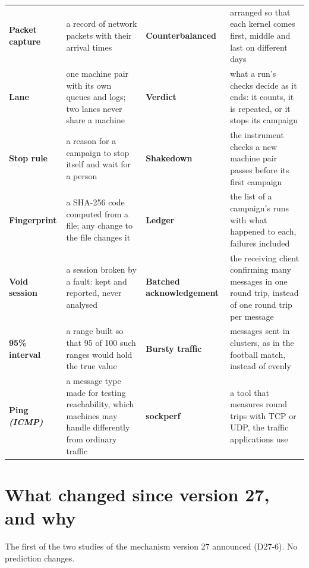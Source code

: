 \documentclass[11pt]{article}
\newcommand{\gl}[1]{{\color{soft}\itshape\small (#1)}}
\begin{document}
{\begin{tabularx}{\linewidth}{@{}>{\bfseries}p{3.1cm} X >{\bfseries}p{3.1cm} X@{}}
Packet capture & a record of network packets with their arrival times & Counterbalanced & arranged so that each kernel comes first, middle and last on different days \\
Lane & one machine pair with its own queues and logs; two lanes never share a machine & Verdict & what a run's checks decide as it ends: it counts, it is repeated, or it stops its campaign \\
Stop rule & a reason for a campaign to stop itself and wait for a person & Shakedown & the instrument checks a new machine pair passes before its first campaign \\
Fingerprint & a SHA-256 code computed from a file; any change to the file changes it & Ledger & the list of a campaign's runs with what happened to each, failures included \\
Void session & a session broken by a fault: kept and reported, never analysed & Batched acknowledgement & the receiving client confirming many messages in one round trip, instead of one round trip per message \\
95\% interval & a range built so that 95 of 100 such ranges would hold the true value & Bursty traffic & messages sent in clusters, as in the football match, instead of evenly \\
Ping \gl{ICMP} & a message type made for testing reachability, which machines may handle differently from ordinary traffic & sockperf & a tool that measures round trips with TCP or UDP, the traffic applications use \\
\end{tabularx}}

\section*{What changed since version 27, and why}
The first of the two studies of the mechanism version 27 announced (D27-6). No prediction
changes.
\end{document}
